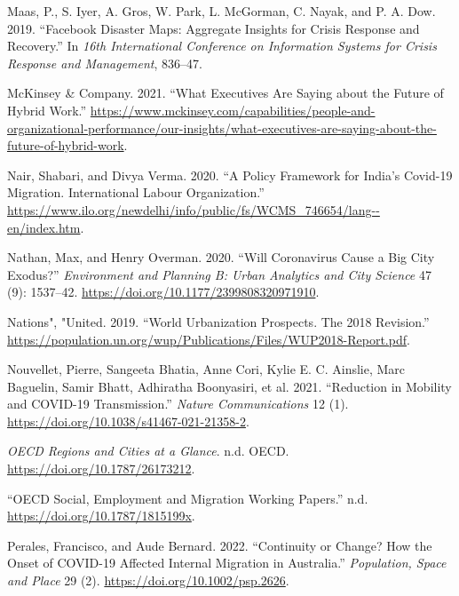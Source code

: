 \documentclass[11pt,letterpaper]{article}
\newlength{\cslhangindent}
\newlength{\cslentryspacingunit} %
\newenvironment{CSLReferences}[2] %
 {%
  \setlength{\parindent}{0pt}
  \ifodd #1
  \let\oldpar\par
  \def\par{\hangindent=\cslhangindent\oldpar}
  \fi
  \setlength{\parskip}{#2\cslentryspacingunit}
 }%
 {}
\begin{document}
\begin{CSLReferences}{1}{0}
\leavevmode{}%
Maas, P., S. Iyer, A. Gros, W. Park, L. McGorman, C. Nayak, and P. A.
Dow. 2019. {``Facebook Disaster Maps: Aggregate Insights for Crisis
Response and Recovery.''} In \emph{16th International Conference on
Information Systems for Crisis Response and Management}, 836--47.

\leavevmode{}%
McKinsey \& Company. 2021. {``What Executives Are Saying about the
Future of Hybrid Work.''}
\url{https://www.mckinsey.com/capabilities/people-and-organizational-performance/our-insights/what-executives-are-saying-about-the-future-of-hybrid-work}.

\leavevmode{}%
Nair, Shabari, and Divya Verma. 2020. {``A Policy Framework for India's
Covid-19 Migration. International Labour Organization.''}
\url{https://www.ilo.org/newdelhi/info/public/fs/WCMS_746654/lang--en/index.htm}.

\leavevmode{}%
Nathan, Max, and Henry Overman. 2020. {``Will Coronavirus Cause a Big
City Exodus?''} \emph{Environment and Planning B: Urban Analytics and
City Science} 47 (9): 1537--42.
\url{https://doi.org/10.1177/2399808320971910}.

\leavevmode{}%
Nations", "United. 2019. {``World Urbanization Prospects. The 2018
Revision.''}
\url{https://population.un.org/wup/Publications/Files/WUP2018-Report.pdf}.

\leavevmode{}%
Nouvellet, Pierre, Sangeeta Bhatia, Anne Cori, Kylie E. C. Ainslie, Marc
Baguelin, Samir Bhatt, Adhiratha Boonyasiri, et al. 2021. {``Reduction
in Mobility and COVID-19 Transmission.''} \emph{Nature Communications}
12 (1). \url{https://doi.org/10.1038/s41467-021-21358-2}.

\leavevmode{}%
\emph{OECD Regions and Cities at a Glance}. n.d. OECD.
\url{https://doi.org/10.1787/26173212}.

\leavevmode{}%
{``OECD Social, Employment and Migration Working Papers.''} n.d.
\url{https://doi.org/10.1787/1815199x}.

\leavevmode{}%
Perales, Francisco, and Aude Bernard. 2022. {``Continuity or Change? How
the Onset of COVID{-}19 Affected Internal Migration in Australia.''}
\emph{Population, Space and Place} 29 (2).
\url{https://doi.org/10.1002/psp.2626}.


\end{CSLReferences}
\end{document}
